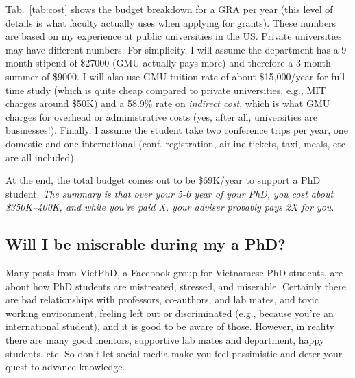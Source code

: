 \documentclass[11pt]{article}
\newcommand{\mycomment}[3][\color{blue}]{{#1{{#2}: {#3}}}}
\newcommand{\tvn}[1]{\mycomment{TVN}{#1}}{}
\begin{document}
Tab.~\ref{tab:cost} shows the budget breakdown for a GRA per year (this level of details is what faculty actually uses when applying for grants).
These numbers are based on my experience at public universities in the US.  Private universities may have different numbers.  For simplicity, I will assume the department has a 9-month stipend of \$27000 (GMU actually pays more) and therefore a 3-month summer of \$9000. I will also use GMU tuition rate of about \$15,000/year for full-time study (which is quite cheap compared to private universities, e.g., MIT charges around \$50K) and a 58.9\% rate on \emph{indirect cost}, which is what GMU charges for overhead or administrative costs (yes, after all, universities are businesses!).  Finally, I assume the student take two conference trips per year, one domestic and one international (conf. registration, airline tickets, taxi, meals, etc are all included). 

At the end, the total budget comes out to be \$69K/year to support a PhD student. \emph{The summary is that over your 5-6 year of your PhD, you cost about \$350K--400K, and while you're paid X, your adviser probably pays 2X for you}.  





\subsection{Will I be miserable during my a PhD?}\label{sec:happy}
Many posts from VietPhD, a Facebook group for Vietnamese PhD students, are about how PhD students are mistreated, stressed, and miserable. Certainly there are bad relationships with professors, co-authors, and lab mates, and toxic working environment, feeling left out or discriminated (e.g., because you're an international student), and it is good to be aware of those.  However, in reality there are many good mentors, supportive lab mates and department, happy students, etc.  So don't let social media make you feel pessimistic and deter your quest to advance knowledge.  
\end{document}
